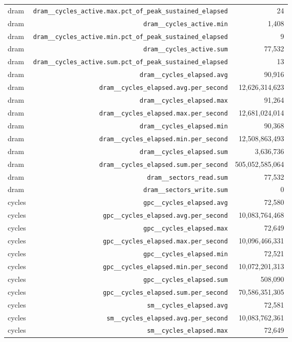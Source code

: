 \begin{table}[h]
\begin{tabular}{|l|r|r|}
dram & \texttt{dram__cycles_active.max.pct_of_peak_sustained_elapsed} & 24 \\
dram & \texttt{dram__cycles_active.min} & 1,408 \\
dram & \texttt{dram__cycles_active.min.pct_of_peak_sustained_elapsed} & 9 \\
dram & \texttt{dram__cycles_active.sum} & 77,532 \\
dram & \texttt{dram__cycles_active.sum.pct_of_peak_sustained_elapsed} & 13 \\
dram & \texttt{dram__cycles_elapsed.avg} & 90,916 \\
dram & \texttt{dram__cycles_elapsed.avg.per_second} & 12,626,314,623 \\
dram & \texttt{dram__cycles_elapsed.max} & 91,264 \\
dram & \texttt{dram__cycles_elapsed.max.per_second} & 12,681,024,014 \\
dram & \texttt{dram__cycles_elapsed.min} & 90,368 \\
dram & \texttt{dram__cycles_elapsed.min.per_second} & 12,508,863,493 \\
dram & \texttt{dram__cycles_elapsed.sum} & 3,636,736 \\
dram & \texttt{dram__cycles_elapsed.sum.per_second} & 505,052,585,064 \\
dram & \texttt{dram__sectors_read.sum} & 77,532 \\
dram & \texttt{dram__sectors_write.sum} & 0 \\
\hline
cycles & \texttt{gpc__cycles_elapsed.avg} & 72,580 \\
cycles & \texttt{gpc__cycles_elapsed.avg.per_second} & 10,083,764,468 \\
cycles & \texttt{gpc__cycles_elapsed.max} & 72,649 \\
cycles & \texttt{gpc__cycles_elapsed.max.per_second} & 10,096,466,331 \\
cycles & \texttt{gpc__cycles_elapsed.min} & 72,521 \\
cycles & \texttt{gpc__cycles_elapsed.min.per_second} & 10,072,201,313 \\
cycles & \texttt{gpc__cycles_elapsed.sum} & 508,090 \\
cycles & \texttt{gpc__cycles_elapsed.sum.per_second} & 70,586,351,305 \\
cycles & \texttt{sm__cycles_elapsed.avg} & 72,581 \\
cycles & \texttt{sm__cycles_elapsed.avg.per_second} & 10,083,762,361 \\
cycles & \texttt{sm__cycles_elapsed.max} & 72,649 \\

\end{tabular}
\end{table}
